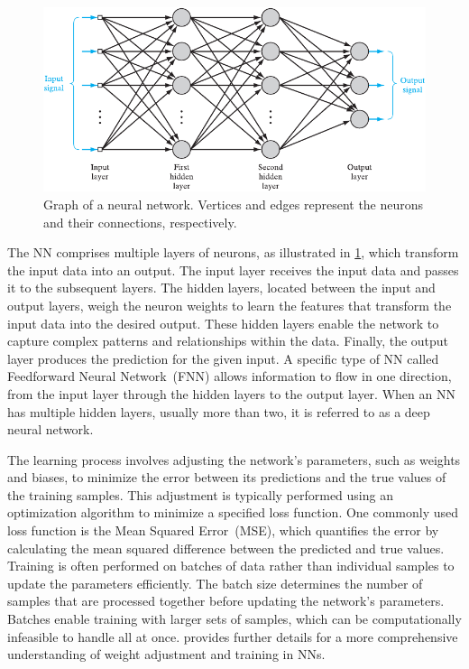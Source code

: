 \begin{figure}[ht]
    \caption[Graph of a neural network.]{Graph of a neural network. Vertices and edges represent the neurons and their connections, respectively.}
    \label{fig:neuralnetwork}
    \addmargin
    \centering
    \includegraphics[width=0.9\linewidth]{figures/network.pdf}
    \addmargin
\end{figure}

The NN comprises multiple layers of neurons, as illustrated in \cref{fig:neuralnetwork}, which transform the input data into an output. The input layer receives the input data and passes it to the subsequent layers. The hidden layers, located between the input and output layers, weigh the neuron weights to learn the features that transform the input data into the desired output. These hidden layers enable the network to capture complex patterns and relationships within the data. Finally, the output layer produces the prediction for the given input. A specific type of NN called Feedforward Neural Network~(FNN) allows information to flow in one direction, from the input layer through the hidden layers to the output layer. When an NN has multiple hidden layers, usually more than two, it is referred to as a deep neural network.

The learning process involves adjusting the network's parameters, such as weights and biases, to minimize the error between its predictions and the true values of the training samples. This adjustment is typically performed using an optimization algorithm to minimize a specified loss function. One commonly used loss function is the Mean Squared Error~(MSE), which quantifies the error by calculating the mean squared difference between the predicted and true values. Training is often performed on batches of data rather than individual samples to update the parameters efficiently. The batch size determines the number of samples that are processed together before updating the network's parameters. Batches enable training with larger sets of samples, which can be computationally infeasible to handle all at once. \citet{Haykin/2009} provides further details for a more comprehensive understanding of weight adjustment and training in NNs.

